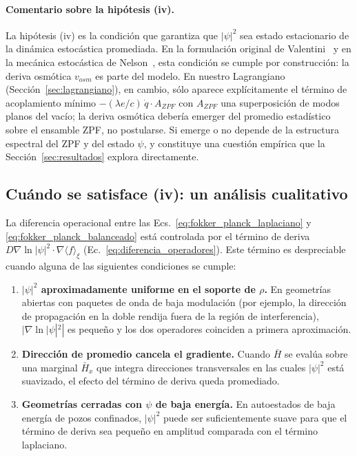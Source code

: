 \documentclass[11pt,a4paper]{article}
\begin{document}
\paragraph{Comentario sobre la hipótesis (iv).}
La hipótesis (iv) es la condición que garantiza que $|\psi|^2$ sea
estado estacionario de la dinámica estocástica promediada. En la
formulación original de Valentini~\cite{Valentini1991a} y en la mecánica
estocástica de Nelson~\cite{Nelson1966}, esta condición se cumple por
construcción: la deriva osmótica $v_{osm}$ es parte del modelo. En
nuestro Lagrangiano (Sección~\ref{sec:lagrangiano}), en cambio, sólo
aparece explícitamente el término de acoplamiento mínimo
$-(\lambda e/c)\,\dot q\cdot A_{ZPF}$ con $A_{ZPF}$ una superposición de
modos planos del vacío; la deriva osmótica debería emerger del promedio
estadístico sobre el ensamble ZPF, no postularse. Si emerge o no
depende de la estructura espectral del ZPF y del estado $\psi$, y
constituye una cuestión empírica que la Sección~\ref{sec:resultados}
explora directamente.

\subsection{Cuándo se satisface (iv): un análisis cualitativo}
\label{sec:cuando_iv}

La diferencia operacional entre las
Ecs.~\eqref{eq:fokker_planck_laplaciano} y
\eqref{eq:fokker_planck_balanceado} está controlada por el término de
deriva $D\nabla\ln|\psi|^2\cdot\nabla\langle f\rangle_\xi$
(Ec.~\ref{eq:diferencia_operadores}). Este término es despreciable
cuando alguna de las siguientes condiciones se cumple:
\begin{enumerate}
\item \textbf{$|\psi|^2$ aproximadamente uniforme en el soporte de
$\rho$.} En geometrías abiertas con paquetes de onda de baja modulación
(por ejemplo, la dirección de propagación en la doble rendija fuera de
la región de interferencia), $|\nabla\ln|\psi|^2|$ es pequeño y los dos
operadores coinciden a primera aproximación.
\item \textbf{Dirección de promedio cancela el gradiente.} Cuando
$\bar{H}$ se evalúa sobre una marginal $\bar{H}_x$ que integra
direcciones transversales en las cuales $|\psi|^2$ está suavizado, el
efecto del término de deriva queda promediado.
\item \textbf{Geometrías cerradas con $\psi$ de baja energía.} En
autoestados de baja energía de pozos confinados, $|\psi|^2$ puede ser
suficientemente suave para que el término de deriva sea pequeño en
amplitud comparada con el término laplaciano.
\end{enumerate}
\end{document}

